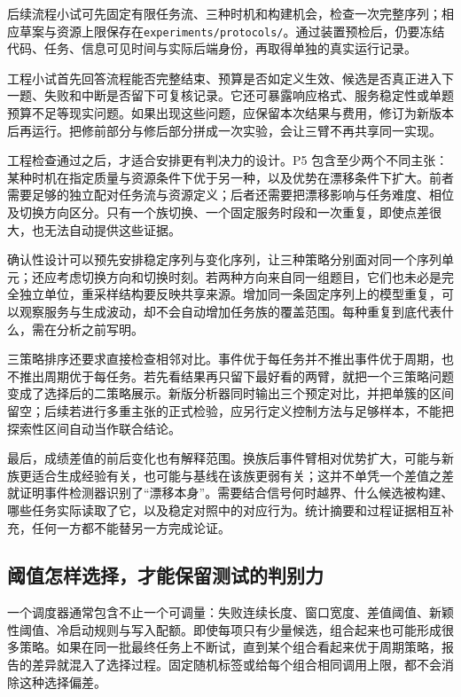 后续流程小试可先固定有限任务流、三种时机和构建机会，检查一次完整序列；相应草案与资源上限保存在\texttt{experiments/protocols/}。通过装置预检后，仍要冻结代码、任务、信息可见时间与实际后端身份，再取得单独的真实运行记录。

工程小试首先回答流程能否完整结束、预算是否如定义生效、候选是否真正进入下一题、失败和中断是否留下可复核记录。它还可暴露响应格式、服务稳定性或单题预算不足等现实问题。如果出现这些问题，应保留本次结果与费用，修订为新版本后再运行。把修前部分与修后部分拼成一次实验，会让三臂不再共享同一实现。

工程检查通过之后，才适合安排更有判决力的设计。P5 包含至少两个不同主张：某种时机在指定质量与资源条件下优于另一种，以及优势在漂移条件下扩大。前者需要足够的独立配对任务流与资源定义；后者还需要把漂移影响与任务难度、相位及切换方向区分。只有一个族切换、一个固定服务时段和一次重复，即使点差很大，也无法自动提供这些证据。

确认性设计可以预先安排稳定序列与变化序列，让三种策略分别面对同一个序列单元；还应考虑切换方向和切换时刻。若两种方向来自同一组题目，它们也未必是完全独立单位，重采样结构要反映共享来源。增加同一条固定序列上的模型重复，可以观察服务与生成波动，却不会自动增加任务族的覆盖范围。每种重复到底代表什么，需在分析之前写明。

三策略排序还要求直接检查相邻对比。事件优于每任务并不推出事件优于周期，也不推出周期优于每任务。若先看结果再只留下最好看的两臂，就把一个三策略问题变成了选择后的二策略展示。新版分析器同时输出三个预定对比，并把单簇的区间留空；后续若进行多重主张的正式检验，应另行定义控制方法与足够样本，不能把探索性区间自动当作联合结论。

最后，成绩差值的前后变化也有解释范围。换族后事件臂相对优势扩大，可能与新族更适合生成经验有关，也可能与基线在该族更弱有关；这并不单凭一个差值之差就证明事件检测器识别了“漂移本身”。需要结合信号何时越界、什么候选被构建、哪些任务实际读取了它，以及稳定对照中的对应行为。统计摘要和过程证据相互补充，任何一方都不能替另一方完成论证。


\subsection{阈值怎样选择，才能保留测试的判别力}

一个调度器通常包含不止一个可调量：失败连续长度、窗口宽度、差值阈值、新颖性阈值、冷启动规则与写入配额。即使每项只有少量候选，组合起来也可能形成很多策略。如果在同一批最终任务上不断试，直到某个组合看起来优于周期策略，报告的差异就混入了选择过程。固定随机标签或给每个组合相同调用上限，都不会消除这种选择偏差。

